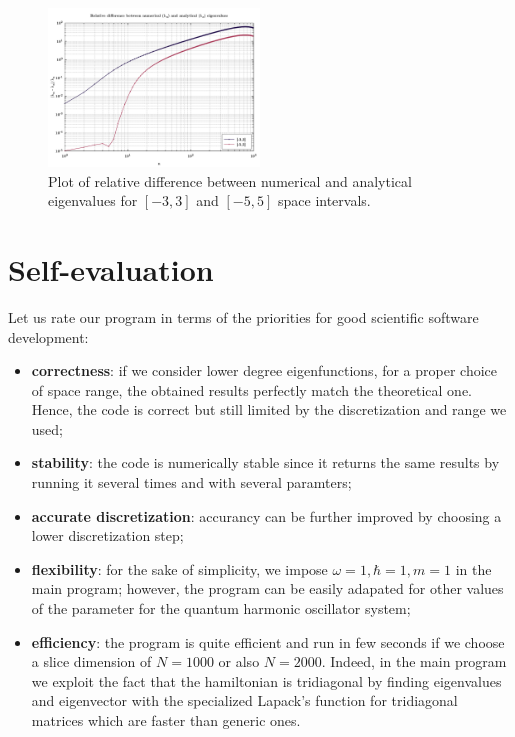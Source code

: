 \documentclass[rmp,10pt,onecolumn,fleqn,notitlepage]{revtex4-1}
\begin{document}
\begin{figure}[h!]
\centering
\includegraphics[width=0.5\textwidth]{image/diff_eig_val.pdf}
\caption{\label{fig:result_eigenval} Plot of relative difference between numerical and analytical eigenvalues for \( [-3,3] \) and \( [-5,5] \) space intervals.}
\end{figure}









\section{Self-evaluation}
Let us rate our program in terms of the priorities for good scientific software development:
\begin{itemize}
\item \textbf{correctness}: if we consider lower degree eigenfunctions, for a proper choice of space range, the obtained results perfectly match the theoretical one. Hence, the code is correct but still limited by the discretization and range we used;

\item \textbf{stability}: the code is numerically stable since it returns the same results by running it several times and with several paramters;

\item \textbf{accurate discretization}: accurancy can be further improved by choosing a lower discretization step;

\item \textbf{flexibility}: for the sake of simplicity, we impose \( \omega =1, \hbar =1, m=1 \) in the main program; however, the program can be easily adapated for other values of the parameter for the quantum harmonic oscillator system;

\item \textbf{efficiency}: the program is quite efficient and run in few seconds if we choose a slice dimension of \( N=1000 \) or also \( N=2000 \). Indeed, in the main program we exploit the fact that the hamiltonian is  tridiagonal by finding eigenvalues and eigenvector with the specialized Lapack's function for tridiagonal matrices which are faster than generic ones.
\end{itemize}
\end{document}
